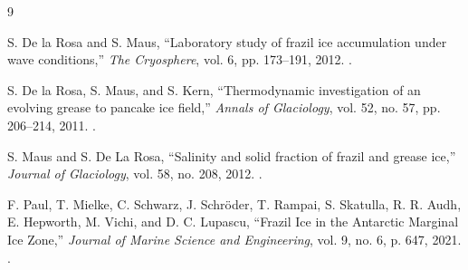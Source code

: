 \documentclass[a4paper,11pt]{article}
\begin{document}
\nocite{DeLaRosaMaus2012,DeLaRosaMausKern2011}
\begin{thebibliography}{9}

S. De la Rosa and S. Maus,
``Laboratory study of frazil ice accumulation under wave conditions,''
\textit{The Cryosphere}, vol. 6, pp. 173--191, 2012.
.

S. De la Rosa, S. Maus, and S. Kern,
``Thermodynamic investigation of an evolving grease to pancake ice field,''
\textit{Annals of Glaciology}, vol. 52, no. 57, pp. 206--214, 2011.
.

S. Maus and S. De La Rosa,
``Salinity and solid fraction of frazil and grease ice,''
\textit{Journal of Glaciology}, vol. 58, no. 208, 2012.
.

F. Paul, T. Mielke, C. Schwarz, J. Schröder, T. Rampai, S. Skatulla,
R. R. Audh, E. Hepworth, M. Vichi, and D. C. Lupascu,
``Frazil Ice in the Antarctic Marginal Ice Zone,''
\textit{Journal of Marine Science and Engineering}, vol. 9, no. 6, p. 647, 2021.
.

\end{thebibliography}
\end{document}
